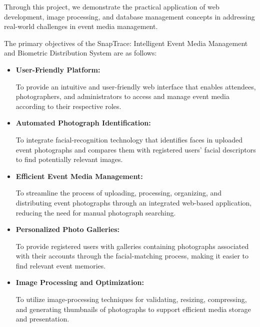 { \normalfont \fontsize{12pt}{15pt}\selectfont
    \par
    \noindent Through this project, we demonstrate the practical application of web development, image processing, and database management concepts in addressing real-world challenges in event media management.
    \par
}
\vspace*{0.5cm}
\vspace{0.5cm}
{ \normalfont \fontsize{12pt}{15pt}\selectfont
    \noindent The primary objectives of the SnapTrace: Intelligent Event Media Management and Biometric Distribution System are as follows: \par
}
\begin{itemize}
    \item \textbf{User-Friendly Platform:}
          \par \noindent To provide an intuitive and user-friendly web interface that enables attendees, photographers, and administrators to access and manage event media according to their respective roles.

    \item \textbf{Automated Photograph Identification:}
          \par \noindent To integrate facial-recognition technology that identifies faces in uploaded event photographs and compares them with registered users' facial descriptors to find potentially relevant images.

    \item \textbf{Efficient Event Media Management:}
          \par \noindent To streamline the process of uploading, processing, organizing, and distributing event photographs through an integrated web-based application, reducing the need for manual photograph searching.

    \item \textbf{Personalized Photo Galleries:}
          \par \noindent To provide registered users with galleries containing photographs associated with their accounts through the facial-matching process, making it easier to find relevant event memories.

    \item \textbf{Image Processing and Optimization:}
          \par \noindent To utilize image-processing techniques for validating, resizing, compressing, and generating thumbnails of photographs to support efficient media storage and presentation.


\end{itemize}
